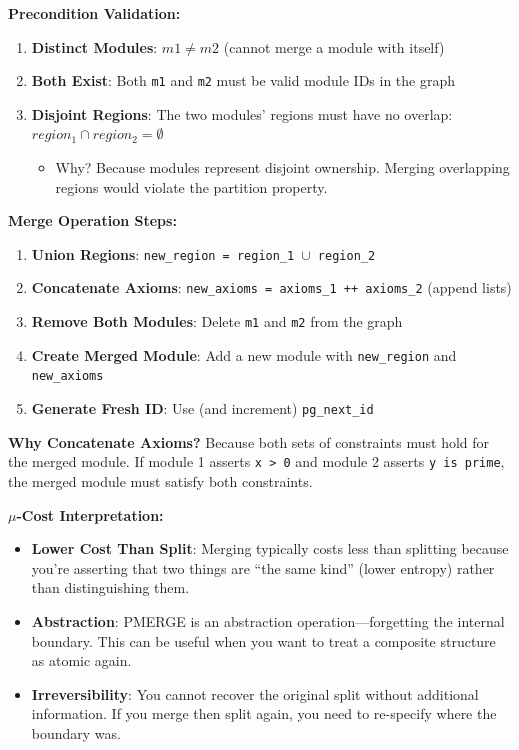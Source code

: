 \textbf{Precondition Validation:}
\begin{enumerate}
    \item \textbf{Distinct Modules}: $m1 \neq m2$ (cannot merge a module with itself)
    \item \textbf{Both Exist}: Both \texttt{m1} and \texttt{m2} must be valid module IDs in the graph
    \item \textbf{Disjoint Regions}: The two modules' regions must have no overlap: $region_1 \cap region_2 = \emptyset$
    \begin{itemize}
        \item Why? Because modules represent disjoint ownership. Merging overlapping regions would violate the partition property.
    \end{itemize}
\end{enumerate}

\textbf{Merge Operation Steps:}
\begin{enumerate}
    \item \textbf{Union Regions}: \texttt{new\_region = region\_1 $\cup$ region\_2}
    \item \textbf{Concatenate Axioms}: \texttt{new\_axioms = axioms\_1 ++ axioms\_2} (append lists)
    \item \textbf{Remove Both Modules}: Delete \texttt{m1} and \texttt{m2} from the graph
    \item \textbf{Create Merged Module}: Add a new module with \texttt{new\_region} and \texttt{new\_axioms}
    \item \textbf{Generate Fresh ID}: Use (and increment) \texttt{pg\_next\_id}
\end{enumerate}

\textbf{Why Concatenate Axioms?} Because both sets of constraints must hold for the merged module. If module 1 asserts \texttt{x > 0} and module 2 asserts \texttt{y\ is\ prime}, the merged module must satisfy both constraints.

\textbf{$\mu$-Cost Interpretation:}
\begin{itemize}
    \item \textbf{Lower Cost Than Split}: Merging typically costs less than splitting because you're asserting that two things are ``the same kind'' (lower entropy) rather than distinguishing them.
    \item \textbf{Abstraction}: PMERGE is an abstraction operation—forgetting the internal boundary. This can be useful when you want to treat a composite structure as atomic again.
    \item \textbf{Irreversibility}: You cannot recover the original split without additional information. If you merge then split again, you need to re-specify where the boundary was.
\end{itemize}

